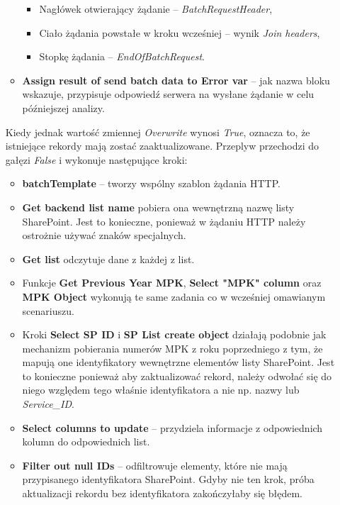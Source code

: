 \begin{enumerate}
\begin{itemize}
\begin{itemize}
        \item Nagłówek otwierający żądanie -- \emph{BatchRequestHeader},
        \item Ciało żądania powstałe w kroku wcześniej -- wynik \emph{Join headers},
        \item Stopkę żądania -- \emph{EndOfBatchRequest}.
    \end{itemize}
    \item \textbf{Assign result of send batch data to Error var} -- jak nazwa bloku wskazuje, przypisuje odpowiedź serwera na wysłane żądanie w celu późniejszej analizy.
    \end{itemize}

    Kiedy jednak wartość zmiennej \emph{Overwrite} wynosi \emph{True}, oznacza to, że istniejące rekordy mają zostać zaaktualizowane. Przeplyw przechodzi do gałęzi \emph{False} i wykonuje następujące kroki:
    \begin{itemize}
        \item \textbf{batchTemplate} -- tworzy wspólny szablon żądania HTTP.
        \item \textbf{Get backend list name} pobiera ona wewnętrzną nazwę listy SharePoint. Jest to konieczne, ponieważ w żądaniu HTTP należy ostrożnie używać znaków specjalnych.
        \item \textbf{Get list} odczytuje dane z każdej z list.
    \end{itemize}
    \begin{itemize}[label=\textasteriskcentered]
\item Funkcje \textbf{Get Previous Year MPK}, \textbf{Select "MPK" column} oraz \textbf{MPK Object} wykonują te same zadania co w wcześniej omawianym scenariuszu. 
    \end{itemize}
    \begin{itemize}
    \item Kroki \textbf{Select SP ID} i \textbf{SP List create object} działają podobnie jak mechanizm pobierania numerów MPK z roku poprzedniego z tym, że mapują one identyfikatory wewnętrzne elementów listy SharePoint. Jest to konieczne ponieważ aby zaktualizować rekord, należy odwołać się do niego względem tego właśnie identyfikatora a nie np. nazwy lub \emph{Service\_ID}.
    \item \textbf{Select columns to update} -- przydziela informacje z odpowiednich kolumn do odpowiednich list.
    \item \textbf{Filter out null IDs} -- odfiltrowuje elementy, które nie mają przypisanego identyfikatora SharePoint. Gdyby nie ten krok, próba aktualizacji rekordu bez identyfikatora zakończyłaby się błędem.

\end{itemize}
\end{enumerate}
